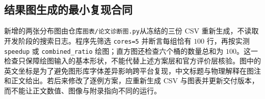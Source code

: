 \subsection{结果图生成的最小复现合同}
新增的两张分布图由仓库\texttt{图表/论文诊断图.py}从冻结的三份 CSV 重新生成，不读取开发阶段的搜索日志。程序先筛选 \texttt{cores=5} 并断言每组恰有 $100$ 行，再按实测 \texttt{speedup} 或 \texttt{combined\_ratio} 绘图；直方图还检查六个桶的数量总和为 $100$。这一检查只保障绘图输入的基本形状，不能代替上述方案层和官方评价层核验。图中的英文坐标是为了避免图形库字体差异影响跨平台复现，中文标题与物理解释在图注和正文给出。若后来修改了逐例方案，应重新生成 CSV 与图表并更新交付版本，而不能让正文数值、图像与附录指向不同的运行。
